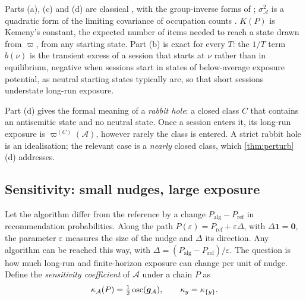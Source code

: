 Parts (a), (c) and (d) are classical \citep[Chs.~3--4]{kemeny1960}, with the group-inverse forms of \citet{meyer1975}; $\sigma^2_{\mathcal A}$ is a quadratic form of the limiting covariance of occupation counts \citep[Thm.~4.6.1]{kemeny1960}. $K(P)$ is Kemeny's constant, the expected number of items needed to reach a state drawn from $\varpi$, from any starting state. Part (b) is exact for every $T$: the $1/T$ term $b(\nu)$ is the transient excess of a session that starts at $\nu$ rather than in equilibrium, negative when sessions start in states of below-average exposure potential, as neutral starting states typically are, so that short sessions understate long-run exposure.

Part (d) gives the formal meaning of a \emph{rabbit hole}: a closed class $C$ that contains an antisemitic state and no neutral state. Once a session enters it, its long-run exposure is $\varpi^{(C)}(\mathcal A)$, however rarely the class is entered. A strict rabbit hole is an idealisation; the relevant case is a \emph{nearly} closed class, which \cref{thm:perturb}(d) addresses.

\subsection{Sensitivity: small nudges, large exposure}\label{sec:markov-perturb}

Let the algorithm differ from the reference by a change $P_{\mathrm{alg}}-P_{\mathrm{ref}}$ in recommendation probabilities. Along the path $P(\varepsilon)=P_{\mathrm{ref}}+\varepsilon\Delta$, with $\Delta\bm1=\bm0$, the parameter $\varepsilon$ measures the size of the nudge and $\Delta$ its direction. Any algorithm can be reached this way, with $\Delta=(P_{\mathrm{alg}}-P_{\mathrm{ref}})/\varepsilon$. The question is how much long-run and finite-horizon exposure can change per unit of nudge. Define the \emph{sensitivity coefficient} of $\mathcal A$ under a chain $P$ as
\[
  \kappa_{\mathcal A}(P)=\tfrac12\operatorname{osc}(\bm g_{\mathcal A}),\qquad \kappa_y=\kappa_{\{y\}} .
\]


